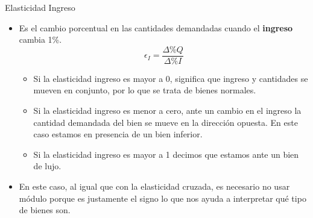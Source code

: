 \documentclass{beamer}
\begin{document}
\begin{frame}{Elasticidad Ingreso}
  \begin{itemize}
    \item Es el cambio porcentual en las cantidades demandadas cuando el \textbf{ingreso} cambia 1\%.
    \begin{equation*}
      \epsilon_I = \frac{\Delta \% Q}{\Delta \% I}
    \end{equation*}    
    \begin{itemize}
        \item Si la elasticidad ingreso es mayor a 0, significa que ingreso y cantidades se mueven en conjunto, por lo que se trata de bienes normales.
        \item Si la elasticidad ingreso es menor a cero, ante un cambio en el ingreso la cantidad demandada del bien se mueve en la dirección opuesta. En este caso estamos en presencia de un bien inferior.
        \item Si la elasticidad ingreso es mayor a 1 decimos que estamos ante un bien de lujo.
    \end{itemize}
    \item  En este caso, al igual que con la elasticidad cruzada, es necesario no usar módulo porque es justamente el signo lo que nos ayuda a interpretar qué tipo de bienes son.
\end{itemize}
\end{frame}
\end{document}
